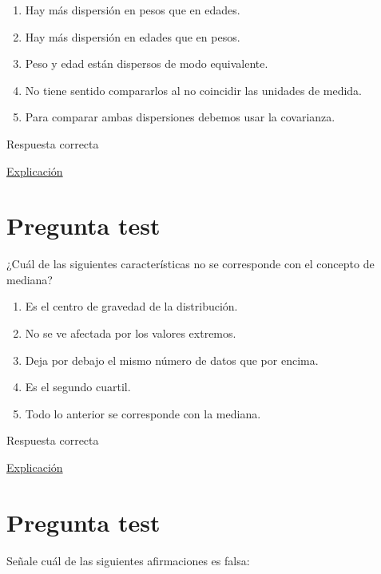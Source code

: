 \documentclass[
]{book}
\providecommand{\tightlist}{%
  \setlength{\itemsep}{0pt}\setlength{\parskip}{0pt}}
\begin{document}
\begin{enumerate}
\def\labelenumi{\alph{enumi})}
\tightlist
\item
  Hay más dispersión en pesos que en edades.
\item
  Hay más dispersión en edades que en pesos.
\item
  Peso y edad están dispersos de modo equivalente.
\item
  No tiene sentido compararlos al no coincidir las unidades de medida.
\item
  Para comparar ambas dispersiones debemos usar la covarianza.
\end{enumerate}

Respuesta correcta

\href{https://1fjmanzano.github.io/bioestadistica/medidas-de-posicio\%CC\%81n-dispersio\%CC\%81n-y-forma.html}{Explicación}

\hypertarget{pregunta-test-66}{%
\section{Pregunta test}\label{pregunta-test-66}}

¿Cuál de las siguientes características no se corresponde con el concepto de mediana?

\begin{enumerate}
\def\labelenumi{\alph{enumi})}
\tightlist
\item
  Es el centro de gravedad de la distribución.
\item
  No se ve afectada por los valores extremos.
\item
  Deja por debajo el mismo número de datos que por encima.
\item
  Es el segundo cuartil.
\item
  Todo lo anterior se corresponde con la mediana.
\end{enumerate}

Respuesta correcta

\href{https://1fjmanzano.github.io/bioestadistica/medidas-de-posicio\%CC\%81n-dispersio\%CC\%81n-y-forma.html\#medidas-de-posicio\%CC\%81n-centrales}{Explicación}

\hypertarget{pregunta-test-67}{%
\section{Pregunta test}\label{pregunta-test-67}}

Señale cuál de las siguientes afirmaciones es falsa:
\end{document}
